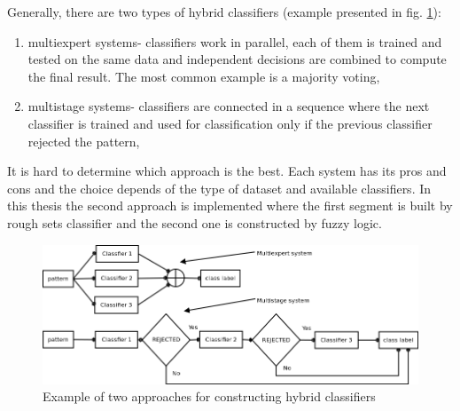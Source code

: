 Generally, there are two types of hybrid classifiers (example presented in fig.
\ref{fig:hybrid}):
\begin{enumerate}
    \item multiexpert systems- classifiers work in parallel, each of them is
        trained and tested on the same data and independent decisions are
        combined to compute the final result. The most common example is a
        majority voting,
    \item multistage systems- classifiers are connected in a sequence where the
        next classifier is trained and used for classification only if the
        previous classifier rejected the pattern,
\end{enumerate}
It is hard to determine which approach is the best. Each system has its pros
and cons and the choice depends of the type of dataset and available
classifiers. In this thesis the second approach is implemented where the first
segment is built by rough sets classifier and the second one is constructed by
fuzzy logic.
\begin{figure}[H] 
    \begin{center}
        \includegraphics[width=\textwidth]{fig/hybrid.png}
    \end{center}
    \caption{Example of two approaches for constructing hybrid classifiers}
    \label{fig:hybrid}
\end{figure}

